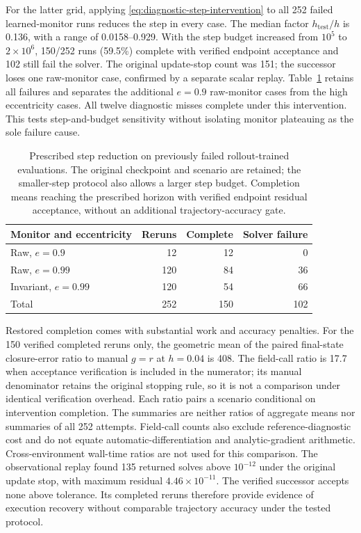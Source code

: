 \documentclass[final,3p,times]{elsarticle}
\begin{document}
For the latter grid, applying \eqref{eq:diagnostic-step-intervention}
to all 252 failed learned-monitor runs reduces the step in every case.
The median factor $h_{\mathrm{test}}/h$ is 0.136, with a range of
0.0158--0.929. With the step budget increased from $10^5$ to
$2\times10^6$, 150/252 runs (59.5\%) complete with verified endpoint
acceptance and 102 still fail the solver. The original update-stop count
was 151; the successor loses one raw-monitor case, confirmed by a separate
scalar replay. Table~\ref{tab:step-intervention} retains all failures and
separates the additional $e=0.9$ raw-monitor cases from the high
eccentricity cases. All twelve diagnostic misses complete under this
intervention. This tests step-and-budget sensitivity without isolating monitor
plateauing as the sole failure cause.

\begin{table}[t]
\centering
\caption{Prescribed step reduction on previously failed rollout-trained
evaluations. The original checkpoint and scenario are retained; the
smaller-step protocol also allows a larger step budget. Completion means
reaching the prescribed horizon with verified endpoint residual acceptance,
without an additional trajectory-accuracy gate.}
\label{tab:step-intervention}
\begingroup
\renewcommand{\baselinestretch}{1}\small
\begin{tabular}{lrrr}
\toprule
Monitor and eccentricity & Reruns & Complete & Solver failure \\
\midrule
Raw, $e=0.9$ & 12 & 12 & 0 \\
Raw, $e=0.99$ & 120 & 84 & 36 \\
Invariant, $e=0.99$ & 120 & 54 & 66 \\
\midrule
Total & 252 & 150 & 102 \\
\bottomrule
\end{tabular}
\endgroup
\end{table}

Restored completion comes with substantial work and accuracy penalties.
For the 150 verified completed reruns only, the geometric mean of the
paired final-state closure-error ratio to manual $g=r$ at $h=0.04$ is
408. The field-call ratio is 17.7 when acceptance verification is included
in the numerator; its manual denominator retains the original stopping
rule, so it is not a comparison under identical verification overhead.
Each ratio pairs a scenario conditional on intervention
completion. The summaries are neither ratios of aggregate means nor
summaries of all 252 attempts. Field-call counts also exclude reference-diagnostic cost and
do not equate automatic-differentiation and analytic-gradient arithmetic.
Cross-environment wall-time ratios are not used for this comparison.
The observational replay found 135 returned solves above $10^{-12}$ under
the original update stop, with maximum residual $4.46\times10^{-11}$.
The verified successor accepts none above tolerance. Its completed reruns
therefore provide evidence of execution recovery
without comparable trajectory accuracy under the tested protocol.
\end{document}
